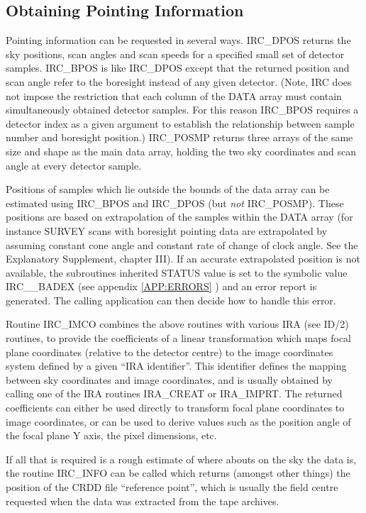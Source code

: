 \subsection {Obtaining Pointing Information}
Pointing information can be requested in several ways. IRC\_DPOS returns the sky
positions, scan angles and scan speeds for a specified small set of detector
samples. IRC\_BPOS is like IRC\_DPOS except that the returned position and scan
angle refer to the boresight instead of any given detector. (Note, IRC does not
impose the restriction that each column of the DATA array must contain
simultaneously obtained detector samples. For this reason IRC\_BPOS requires a
detector index as a given argument to establish the relationship between sample
number and boresight position.) IRC\_POSMP returns three arrays of the same size
and shape as the main data array, holding the two sky coordinates and scan 
angle at every detector sample. 

Positions of samples which lie outside the bounds of the data array can be
estimated using IRC\_BPOS and IRC\_DPOS (but {\em not} IRC\_POSMP). These
positions are based on extrapolation of the samples within the DATA array (for
instance SURVEY scans with boresight pointing data are extrapolated by assuming
constant cone angle and constant rate of change of clock angle. See the
Explanatory Supplement, chapter III). If an accurate extrapolated position is
not available, the subroutines inherited STATUS value is set to the symbolic
value IRC\_\_BADEX (see appendix \ref {APP:ERRORS} ) and an error report is
generated. The calling application can then decide how to handle this error. 

Routine IRC\_IMCO combines the above routines with various IRA (see ID/2)
routines, to provide the coefficients of a linear transformation which maps
focal plane coordinates (relative to the detector centre) to the image
coordinates system defined by a given ``IRA identifier''. This identifier
defines the mapping between sky coordinates and image coordinates, and is
usually obtained by calling one of the IRA routines IRA\_CREAT or IRA\_IMPRT.
The returned coefficients can either be used directly to transform focal plane
coordinates to image coordinates, or can be used to derive values such as the
position angle of the focal plane Y axis, the pixel dimensions, etc. 

If all that is required is a rough estimate of where abouts on the sky the data
is, the routine IRC\_INFO can be called which returns (amongst other things) the
position of the CRDD file ``reference point'', which is usually the
field centre requested when the data was extracted from the tape archives. 

